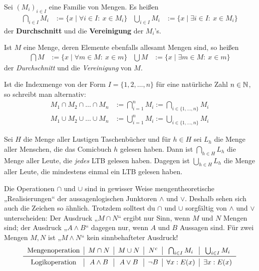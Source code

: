 \begin{de} \label{def:mehrfachcapcup}
    Sei $(M_i)_{i\in I}$ eine Familie von Mengen. Es heißen
    \begin{align*}
        \bigcap_{i\in I} M_i &:= \{x \mid \forall i\in I:\ x\in M_i\} & \bigcup_{i\in I}M_i &:= \{x \mid \exists i\in I:\ x\in M_i\}
    \end{align*}
    der \textbf{Durchschnitt} und die \textbf{Vereinigung} der $M_i$'s.
    
    Ist $M$ eine Menge, deren Elemente ebenfalls allesamt Mengen sind, so heißen
    \begin{align*}
        \bigcap M & := \{ x \mid \forall m\in M:\ x\in m \} & \bigcup M & := \{x\mid \exists m\in M:\ x\in m \}
    \end{align*}
    der \emph{Durchschnitt} und die \emph{Vereinigung} von $M$.
\end{de}


\begin{nota} \label{alternativmehrfachcapcup}
    Ist die Indexmenge von der Form $I=\{1,2,\dots,n\}$ für eine natürliche Zahl $n\in \mathbb N$, so schreibt man alternativ:
    \begin{align*}
        M_1\cap M_2\cap\ldots\cap M_n & := \bigcap_{i=1}^n M_i := \bigcap_{i\in \{1,\dots , n\}} M_i\\
        M_1\cup M_2\cup\ldots\cup M_n & := \bigcup_{i=1}^n M_i := \bigcup_{i\in \{1,\dots , n\}} M_i
    \end{align*}
\end{nota}


\begin{bsp}
    Sei $H$ die Menge aller Lustigen Taschenbücher und für $h\in H$ sei $L_h$ die Menge aller Menschen, die das Comicbuch $h$ gelesen haben. Dann ist $\bigcap_{h\in H} L_h$ die Menge aller Leute, die \emph{jedes} LTB gelesen haben. Dagegen ist $\bigcup_{h\in H} L_h$ die Menge aller Leute, die mindestens einmal ein LTB gelesen haben.
\end{bsp}


\begin{bem}
    Die Operationen $\cap$ und $\cup$ sind in gewisser Weise mengentheoretische „Realisierungen“ der aussagenlogischen Junktoren $\land$ und $\lor$. Deshalb sehen sich auch die Zeichen so ähnlich. Trotzdem solltest du $\cap$ und $\cup$ sorgfältig von $\land$ und $\lor$ unterscheiden: Der Ausdruck „$M\cap N$“ ergibt nur Sinn, wenn $M$ und $N$ Mengen sind; der Ausdruck „$A\wedge B$“ dagegen nur, wenn $A$ und $B$ Aussagen sind. Für zwei Mengen $M,N$ ist „$M\land N$“ kein sinnbehafteter Ausdruck!
    \[\begin{tabular}{c|c|c|c|c|c}
        Mengenoperation & $M\cap N$ & $M\cup N$ & $N^c$ & $\bigcap_{i\in I} M_i$ & $\bigcup_{i\in I} M_i$ \\ \midrule
        Logikoperation & $A\land B$ & $A \lor B$ & $\neg B$ & $\forall x: E(x)$ & $\exists x: E(x)$
    \end{tabular}\]
\end{bem}



